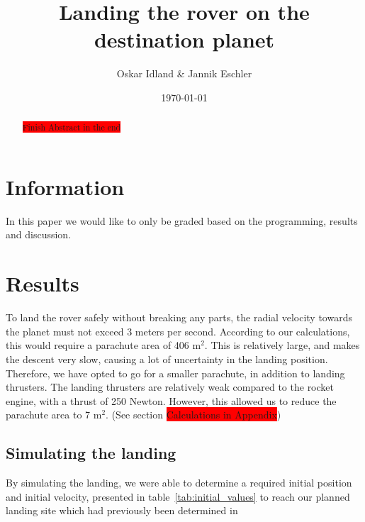 \documentclass[reprint,english,notitlepage]{revtex4-2}
\begin{document}
\title{Landing the rover on the destination planet}
\author{Oskar Idland \& Jannik Eschler}
\date{\today}

\begin{abstract}
    \colorbox{red}{Finish Abstract in the end}
\end{abstract}

\maketitle
\onecolumngrid
\section{Information} \label{sec:info}
\begin{center}
    In this paper we would like to only be graded based on the programming, results and discussion.
\end{center}
\vspace{20}
\twocolumngrid

\section{Results} \label{sec:results}
    To land the rover safely without breaking any parts, the radial velocity towards the planet must not exceed 3 meters per second.
    According to our calculations, this would require a parachute area of 406 m$^2$.
    This is relatively large, and makes the descent very slow, causing a lot of uncertainty in the landing position.\\
    Therefore, we have opted to go for a smaller parachute, in addition to landing thrusters.
    The landing thrusters are relatively weak compared to the rocket engine, with a thrust of 250 Newton.
    However, this allowed us to reduce the parachute area to 7 m$^2$. (See section \colorbox{red}{Calculations in Appendix})

\subsection{Simulating the landing}\label{subsec:simulating-the-landing}
    By simulating the landing, we were able to determine a required initial position and initial velocity, presented in table~\ref{tab:initial_values} to reach our planned landing site which had previously been determined in%
\end{document}
